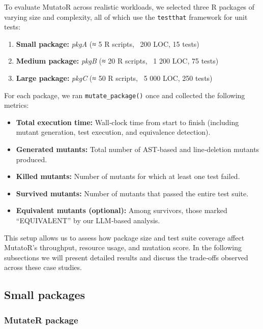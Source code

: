 To evaluate MutatoR across realistic workloads, we selected three R packages of varying size and complexity, all of which use the \texttt{testthat} framework for unit tests:

\begin{enumerate}
  \item \textbf{Small package:} \emph{pkgA} (≈ 5 R scripts, ~200 LOC, 15 tests)  
  \item \textbf{Medium package:} \emph{pkgB} (≈ 20 R scripts, ~1 200 LOC, 75 tests)  
  \item \textbf{Large package:} \emph{pkgC} (≈ 50 R scripts, ~5 000 LOC, 250 tests)  
\end{enumerate}

For each package, we ran \texttt{mutate\_package()} once and collected the following metrics:

\begin{itemize}
  \item \textbf{Total execution time:} Wall‐clock time from start to finish (including mutant generation, test execution, and equivalence detection).  
  \item \textbf{Generated mutants:} Total number of AST‐based and line‐deletion mutants produced.  
  \item \textbf{Killed mutants:} Number of mutants for which at least one test failed.  
  \item \textbf{Survived mutants:} Number of mutants that passed the entire test suite.  
  \item \textbf{Equivalent mutants (optional):} Among survivors, those marked “EQUIVALENT” by our LLM‐based analysis.
\end{itemize}

This setup allows us to assess how package size and test suite coverage affect MutatoR’s throughput, resource usage, and mutation score.  In the following subsections we will present detailed results and discuss the trade‐offs observed across these case studies.

\subsection{Small packages}


\subsubsection{MutateR package}

